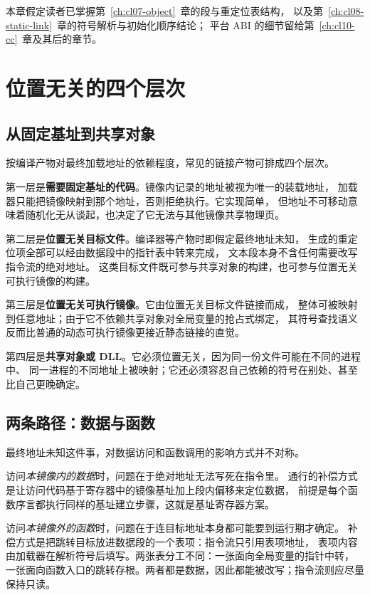 \documentclass[12pt,a4paper,fontset=fandol]{ctexbook}
\begin{document}
本章假定读者已掌握第~\ref{ch:cl07-object}~章的段与重定位表结构，
以及第~\ref{ch:cl08-static-link}~章的符号解析与初始化顺序结论；
平台 ABI 的细节留给第~\ref{ch:cl10-cc}~章及其后的章节。

\section{位置无关的四个层次}\label{sec:cl09-pic-layers}

\subsection{从固定基址到共享对象}

按编译产物对最终加载地址的依赖程度，常见的链接产物可排成四个层次。

第一层是\textbf{需要固定基址的代码}。镜像内记录的地址被视为唯一的装载地址，
加载器只能把镜像映射到那个地址，否则拒绝执行。它实现简单，
但地址不可移动意味着随机化无从谈起，也决定了它无法与其他镜像共享物理页。

第二层是\textbf{位置无关目标文件}。编译器等产物时即假定最终地址未知，
生成的重定位项全部可以经由数据段中的指针表中转来完成，
文本段本身不含任何需要改写指令流的绝对地址。
这类目标文件既可参与共享对象的构建，也可参与位置无关可执行镜像的构建。

第三层是\textbf{位置无关可执行镜像}。它由位置无关目标文件链接而成，
整体可被映射到任意地址；由于它不依赖共享对象对全局变量的抢占式绑定，
其符号查找语义反而比普通的动态可执行镜像更接近静态链接的直觉。

第四层是\textbf{共享对象或 DLL}。它必须位置无关，因为同一份文件可能在不同的进程中、
同一进程的不同地址上被映射；它还必须容忍自己依赖的符号在别处、甚至比自己更晚确定。

\subsection{两条路径：数据与函数}

最终地址未知这件事，对数据访问和函数调用的影响方式并不对称。

访问\emph{本镜像内的数据}时，问题在于绝对地址无法写死在指令里。
通行的补偿方式是让访问代码基于寄存器中的镜像基址加上段内偏移来定位数据，
前提是每个函数序言都执行同样的基址建立步骤，这就是基址寄存器方案。

访问\emph{本镜像外的函数}时，问题在于连目标地址本身都可能要到运行期才确定。
补偿方式是把跳转目标放进数据段的一个表项：指令流只引用表项地址，
表项内容由加载器在解析符号后填写。两张表分工不同：一张面向全局变量的指针中转，
一张面向函数入口的跳转存根。两者都是数据，因此都能被改写；指令流则应尽量保持只读。
\end{document}
